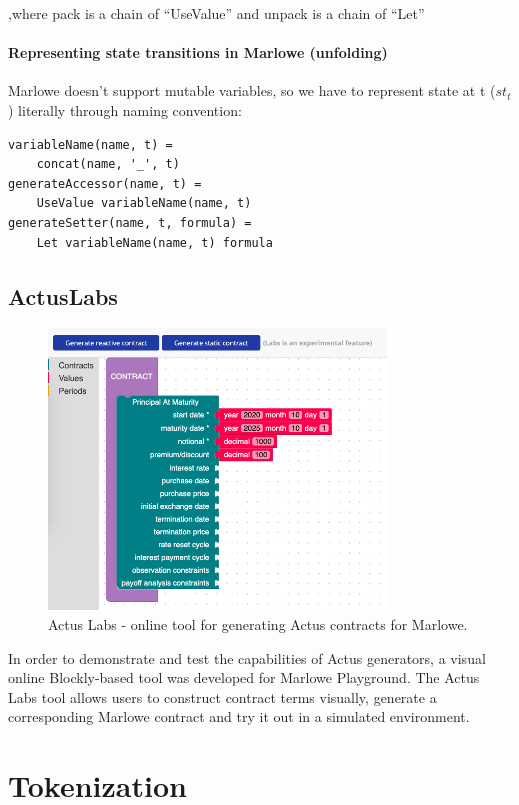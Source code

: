 \documentclass[runningheads]{llncs}
\begin{document}
,where pack is a chain of ``UseValue'' and unpack is a chain of
``Let''

\paragraph{Representing state transitions in Marlowe (unfolding)}

Marlowe doesn't support mutable variables, so we have to represent
state at t ($st_{t}$) literally through naming convention:

\begin{verbatim}
variableName(name, t) = 
	concat(name, '_', t) 
generateAccessor(name, t) = 
	UseValue variableName(name, t) 
generateSetter(name, t, formula) = 
	Let variableName(name, t) formula 
\end{verbatim}


\subsection{ActusLabs}

\begin{figure} 
\includegraphics[width=0.8\textwidth]{images/labs.png}
\caption{Actus Labs - online tool for generating Actus contracts for Marlowe.} 
\label{fig3} 
\end{figure} 

In order to demonstrate and test the capabilities of Actus generators,
a visual online Blockly-based tool was developed for Marlowe Playground.
The Actus Labs tool allows users to construct contract terms visually,
generate a corresponding Marlowe contract and try it out in a simulated
environment.

\section{Tokenization}
\end{document}
